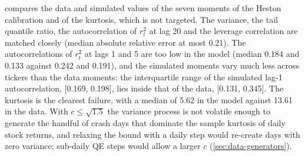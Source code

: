  compares the data and simulated values of the seven moments of the
Heston calibration and of the kurtosis, which is not targeted. The variance, the tail quantile
ratio, the autocorrelation of $r_t^2$ at lag 20 and the leverage correlation are matched closely
(median absolute relative error at most 0.21). The autocorrelations of $r_t^2$ at lags 1 and 5
are too low in the model (median 0.184 and 0.133 against 0.242 and 0.191), and the simulated
moments vary much less across tickers than the data moments: the interquartile range of the
simulated lag-1 autocorrelation, [0.169, 0.198], lies inside that of the data, [0.131, 0.345].
The kurtosis is the clearest failure, with a median of 5.62 in the model against 13.61 in the
data. With $c\le\sqrt{1.5}$ the variance process is not volatile enough to generate the handful
of crash days that dominate the sample kurtosis of daily stock returns, and relaxing the bound
with a daily step would re-create days with zero variance; sub-daily QE steps would allow a larger
$c$ (\cref{sec:data-generators}).

\begin{table}[tbp]
  \centering
  \caption{Heston calibration by the simulated method of moments: data and simulated moments
    (E3, 100 tickers, \TRAIN{}).}
  \label{tab:e3-heston-moments}
  \small
\end{table}
